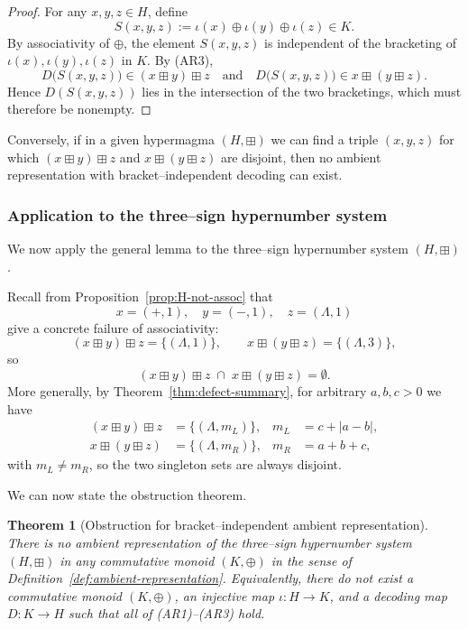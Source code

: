 \documentclass[11pt]{amsart}
\numberwithin{equation}{section}
\newtheorem{theorem}{Theorem}[section]
\theoremstyle{definition}
\theoremstyle{remark}
\newcommand{\Hnum}{H}                      %
\newcommand{\op}{\boxplus}                 %
\begin{document}
\begin{proof}
For any $x,y,z\in H$, define
\[
  S(x,y,z)
  := \iota(x)\oplus\iota(y)\oplus\iota(z)\in K.
\]
By associativity of $\oplus$, the element $S(x,y,z)$ is independent of
the bracketing of $\iota(x),\iota(y),\iota(z)$ in $K$.  By (AR3),
\[
  D\bigl(S(x,y,z)\bigr)
  \in (x\boxplus y)\boxplus z
  \quad\text{and}\quad
  D\bigl(S(x,y,z)\bigr)
  \in x\boxplus(y\boxplus z).
\]
Hence $D(S(x,y,z))$ lies in the intersection of the two bracketings,
which must therefore be nonempty.
\end{proof}

Conversely, if in a given hypermagma $(H,\boxplus)$ we can find a
triple $(x,y,z)$ for which $(x\boxplus y)\boxplus z$ and
$x\boxplus(y\boxplus z)$ are disjoint, then no ambient representation
with bracket–independent decoding can exist.

\subsubsection*{Application to the three--sign hypernumber system}

We now apply the general lemma to the three--sign hypernumber system
$(\Hnum,\op)$.

Recall from Proposition~\ref{prop:H-not-assoc} that
\[
  x=(+,1),\quad y=(-,1),\quad z=(\Lambda,1)
\]
give a concrete failure of associativity:
\[
  (x\op y)\op z
  = \{(\Lambda,1)\},
  \qquad
  x\op(y\op z)
  = \{(\Lambda,3)\},
\]
so
\[
  (x\op y)\op z
  \;\cap\;
  x\op(y\op z)
  = \emptyset.
\]
More generally, by Theorem~\ref{thm:defect-summary}, for arbitrary
$a,b,c>0$ we have
\begin{align*}
  (x\op y)\op z
  &= \{(\Lambda,m_L)\},
  & m_L &= c+|a-b|,\\
  x\op(y\op z)
  &= \{(\Lambda,m_R)\},
  & m_R &= a+b+c,
\end{align*}
with $m_L\ne m_R$, so the two singleton sets are always disjoint.

We can now state the obstruction theorem.

\begin{theorem}[Obstruction for bracket–independent ambient representation]
\label{thm:nogo-ambient}
There is no ambient representation of the three--sign hypernumber
system $(\Hnum,\op)$ in any commutative monoid $(K,\oplus)$ in the
sense of Definition~\ref{def:ambient-representation}.  Equivalently,
there do not exist a commutative monoid $(K,\oplus)$, an injective map
$\iota:\Hnum\to K$, and a decoding map $D:K\to\Hnum$ such that
\emph{all} of (AR1)--(AR3) hold.
\end{theorem}
\end{document}
